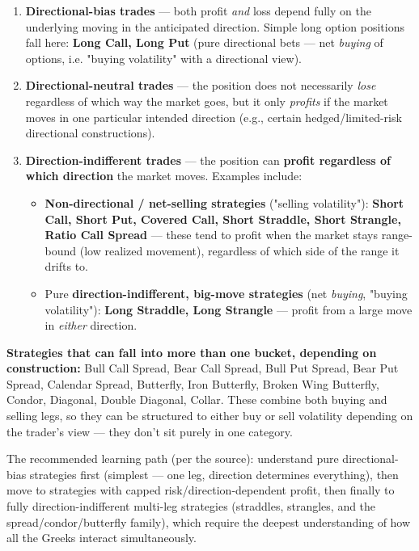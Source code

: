 \documentclass[12pt,openany]{book}
\theoremstyle{definition}
\theoremstyle{remark}
\begin{document}
\begin{enumerate}
\item \textbf{Directional-bias trades} — both profit \emph{and} loss depend fully on the underlying moving in the anticipated direction. Simple long option positions fall here: \textbf{Long Call, Long Put} (pure directional bets — net \emph{buying} of options, i.e. "buying volatility" with a directional view).

\item \textbf{Directional-neutral trades} — the position does not necessarily \emph{lose} regardless of which way the market goes, but it only \emph{profits} if the market moves in one particular intended direction (e.g., certain hedged/limited-risk directional constructions).

\item \textbf{Direction-indifferent trades} — the position can \textbf{profit regardless of which direction} the market moves. Examples include:
\begin{itemize}
\item \textbf{Non-directional / net-selling strategies} ("selling volatility"): \textbf{Short Call, Short Put, Covered Call, Short Straddle, Short Strangle, Ratio Call Spread} — these tend to profit when the market stays range-bound (low realized movement), regardless of which side of the range it drifts to.
\item Pure \textbf{direction-indifferent, big-move strategies} (net \emph{buying}, "buying volatility"): \textbf{Long Straddle, Long Strangle} — profit from a large move in \emph{either} direction.
\end{itemize}
\end{enumerate}

\textbf{Strategies that can fall into more than one bucket, depending on construction:} Bull Call Spread, Bear Call Spread, Bull Put Spread, Bear Put Spread, Calendar Spread, Butterfly, Iron Butterfly, Broken Wing Butterfly, Condor, Diagonal, Double Diagonal, Collar. These combine both buying and selling legs, so they can be structured to either buy or sell volatility depending on the trader's view — they don't sit purely in one category.

The recommended learning path (per the source): understand pure directional-bias strategies first (simplest — one leg, direction determines everything), then move to strategies with capped risk/direction-dependent profit, then finally to fully direction-indifferent multi-leg strategies (straddles, strangles, and the spread/condor/butterfly family), which require the deepest understanding of how all the Greeks interact simultaneously.
\end{document}
